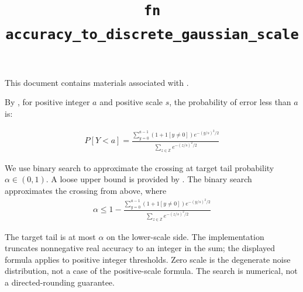 \documentclass{article}
\title{\texttt{fn accuracy\_to\_discrete\_gaussian\_scale}}
\author{\MichaelShoemateAuthor}
\begin{document}
\maketitle
\contrib

This document contains materials associated with .

By ,
for positive integer $a$ and positive scale $s$, the probability of error less than $a$ is:

\begin{align*}
    P[Y<a] = \frac{\sum_{y=0}^{a - 1} (1 + 1[y \ne 0]) e^{-(y/s)^2/2}}{\sum_{z \in \mathbb{Z}} e^{-(z/s)^2/2}}
\end{align*}

We use binary search to approximate the crossing at target tail probability $\alpha\in(0,1)$.
A loose upper bound is provided by .
The binary search approximates the crossing from above, where
\begin{align*}
    \alpha \le 1 - \frac{\sum_{y=0}^{a - 1} (1 + 1[y \ne 0]) e^{-(y/s)^2/2}}{\sum_{z \in \mathbb{Z}} e^{-(z/s)^2/2}}
\end{align*}

The target tail is at most $\alpha$ on the lower-scale side. The implementation truncates nonnegative real accuracy to an integer in the sum; the displayed formula applies to positive integer thresholds. Zero scale is the degenerate noise distribution, not a case of the positive-scale formula. The search is numerical, not a directed-rounding guarantee.
\end{document}
